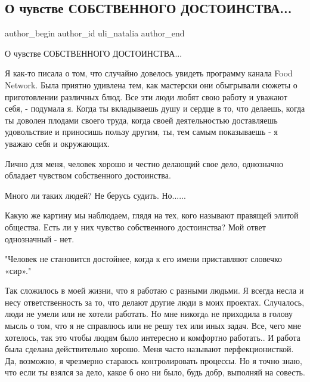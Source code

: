  
 
 
 
 
 
\subsection{О чувстве СОБСТВЕННОГО ДОСТОИНСТВА...}
\label{sec:16_09_2021.fb.uli_natalia.1.dostoinstvo_ukraina}
 
\ifcmt
 author_begin
   author_id uli_natalia
 author_end
\fi

О чувстве СОБСТВЕННОГО ДОСТОИНСТВА...

Я как-то писала о том, что случайно довелось увидеть программу канала Food
Network. Была приятно удивлена тем, как мастерски они обыгрывали сюжеты о
приготовлении различных блюд. Все эти люди любят свою работу и уважают себя, -
подумала я. Когда ты вкладываешь душу и сердце в то, что делаешь, когда ты
доволен плодами своего труда, когда своей деятельностью доставляешь
удовольствие и приносишь пользу другим, ты, тем самым показываешь - я  уважаю
себя и окружающих.

Лично для меня, человек хорошо и честно делающий свое дело, однозначно обладает
чувством собственного достоинства.

Много ли таких людей? Не берусь судить. Но......

Какую же картину мы наблюдаем, глядя на тех, кого называют правящей элитой
общества. Есть ли у них чувство собственного достоинства? Мой ответ однозначный
- нет.

"Человек не становится достойнее, когда к его имени приставляют словечко
«сир»."

Так  сложилось в моей жизни, что я работаю с разными людьми.  Я всегда несла и
несу ответственность за то, что делают другие люди в моих проектах. Случалось,
люди не умели или не хотели работать. Но мне никогдa не приходила в голову
мысль о том, что я не справлюсь или не решу тех или иных задач. Все, чего мне
хотелось, так это  чтобы людям было интересно и комфортно работать.. И работа
была сделана действительно хорошо. Меня часто называют перфекционисткой. Да,
возможно, я чрезмерно стараюсь контролировать процессы. Но я точно знаю, что
если ты взялся за дело, какое б оно ни было, будь добр, выполняй на совесть. 

